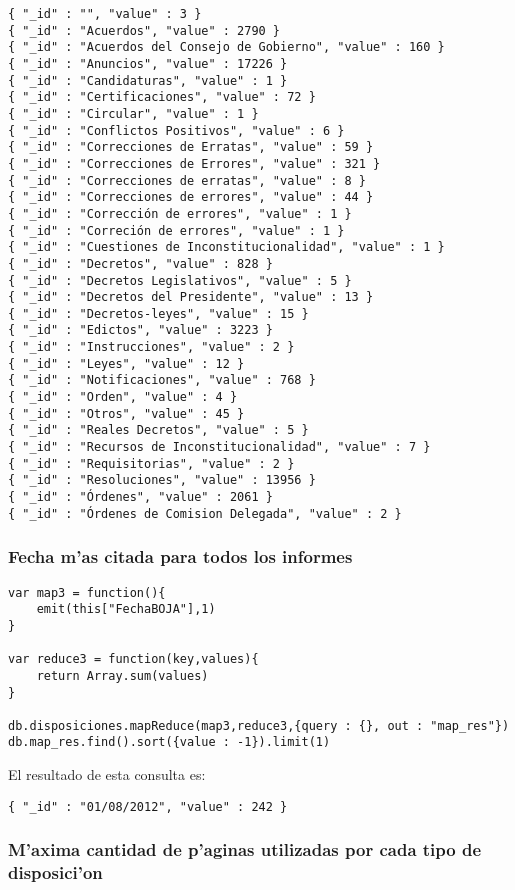 \begin{verbatim}
{ "_id" : "", "value" : 3 }
{ "_id" : "Acuerdos", "value" : 2790 }
{ "_id" : "Acuerdos del Consejo de Gobierno", "value" : 160 }
{ "_id" : "Anuncios", "value" : 17226 }
{ "_id" : "Candidaturas", "value" : 1 }
{ "_id" : "Certificaciones", "value" : 72 }
{ "_id" : "Circular", "value" : 1 }
{ "_id" : "Conflictos Positivos", "value" : 6 }
{ "_id" : "Correcciones de Erratas", "value" : 59 }
{ "_id" : "Correcciones de Errores", "value" : 321 }
{ "_id" : "Correcciones de erratas", "value" : 8 }
{ "_id" : "Correcciones de errores", "value" : 44 }
{ "_id" : "Corrección de errores", "value" : 1 }
{ "_id" : "Correción de errores", "value" : 1 }
{ "_id" : "Cuestiones de Inconstitucionalidad", "value" : 1 }
{ "_id" : "Decretos", "value" : 828 }
{ "_id" : "Decretos Legislativos", "value" : 5 }
{ "_id" : "Decretos del Presidente", "value" : 13 }
{ "_id" : "Decretos-leyes", "value" : 15 }
{ "_id" : "Edictos", "value" : 3223 }
{ "_id" : "Instrucciones", "value" : 2 }
{ "_id" : "Leyes", "value" : 12 }
{ "_id" : "Notificaciones", "value" : 768 }
{ "_id" : "Orden", "value" : 4 }
{ "_id" : "Otros", "value" : 45 }
{ "_id" : "Reales Decretos", "value" : 5 }
{ "_id" : "Recursos de Inconstitucionalidad", "value" : 7 }
{ "_id" : "Requisitorias", "value" : 2 }
{ "_id" : "Resoluciones", "value" : 13956 }
{ "_id" : "Órdenes", "value" : 2061 }
{ "_id" : "Órdenes de Comision Delegada", "value" : 2 }
\end{verbatim}

\subsubsection{Fecha m'as citada para todos los informes}

\begin{verbatim}
var map3 = function(){
    emit(this["FechaBOJA"],1)
}

var reduce3 = function(key,values){
    return Array.sum(values)
}

db.disposiciones.mapReduce(map3,reduce3,{query : {}, out : "map_res"})
db.map_res.find().sort({value : -1}).limit(1)
\end{verbatim}

El resultado de esta consulta es:

\begin{verbatim}
{ "_id" : "01/08/2012", "value" : 242 }
\end{verbatim}

\subsubsection{M'axima cantidad de p'aginas utilizadas por cada tipo de disposici'on}

